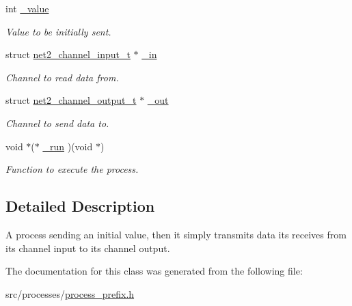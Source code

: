 \begin{DoxyCompactItemize}
\item 
\hypertarget{structprocess__prefix__int__t_a3eb6bb5119e08bf5a9696eec979125f9}{}int \hyperlink{structprocess__prefix__int__t_a3eb6bb5119e08bf5a9696eec979125f9}{\+\_\+value}\label{structprocess__prefix__int__t_a3eb6bb5119e08bf5a9696eec979125f9}

\begin{DoxyCompactList}\small\item\em Value to be initially sent. \end{DoxyCompactList}\item 
\hypertarget{structprocess__prefix__int__t_ad19e6225649b296a9e7b4b3b369c6ebb}{}struct \hyperlink{structnet2__channel__input__t}{net2\+\_\+channel\+\_\+input\+\_\+t} $\ast$ \hyperlink{structprocess__prefix__int__t_ad19e6225649b296a9e7b4b3b369c6ebb}{\+\_\+in}\label{structprocess__prefix__int__t_ad19e6225649b296a9e7b4b3b369c6ebb}

\begin{DoxyCompactList}\small\item\em Channel to read data from. \end{DoxyCompactList}\item 
\hypertarget{structprocess__prefix__int__t_a96137e412c64efd095310606260dddb4}{}struct \hyperlink{structnet2__channel__output__t}{net2\+\_\+channel\+\_\+output\+\_\+t} $\ast$ \hyperlink{structprocess__prefix__int__t_a96137e412c64efd095310606260dddb4}{\+\_\+out}\label{structprocess__prefix__int__t_a96137e412c64efd095310606260dddb4}

\begin{DoxyCompactList}\small\item\em Channel to send data to. \end{DoxyCompactList}\item 
\hypertarget{structprocess__prefix__int__t_a06238f878de1508624f6f3c4381cd45b}{}void $\ast$($\ast$ \hyperlink{structprocess__prefix__int__t_a06238f878de1508624f6f3c4381cd45b}{\+\_\+run} )(void $\ast$)\label{structprocess__prefix__int__t_a06238f878de1508624f6f3c4381cd45b}

\begin{DoxyCompactList}\small\item\em Function to execute the process. \end{DoxyCompactList}\end{DoxyCompactItemize}


\subsection{Detailed Description}
A process sending an initial value, then it simply transmits data its receives from its channel input to its channel output. 

The documentation for this class was generated from the following file\+:\begin{DoxyCompactItemize}
\item 
src/processes/\hyperlink{process__prefix_8h}{process\+\_\+prefix.\+h}\end{DoxyCompactItemize}
